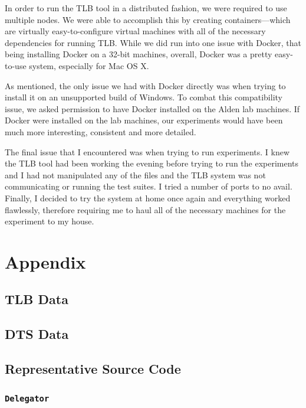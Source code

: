 \documentclass{article}
\begin{document}
{In order to run the TLB tool in a distributed fashion, we were required to use multiple nodes.
We were able to accomplish this by creating containers---which are virtually easy-to-configure
virtual machines with all of the necessary dependencies for running TLB. While we did run
into one issue with Docker, that being installing Docker on a 32-bit machines, overall,
Docker was a pretty easy-to-use system, especially for Mac OS X.

As mentioned, the only issue we had with Docker directly was when trying to install it on an unsupported
build of Windows. To combat this compatibility issue, we asked permission to have Docker
installed on the Alden lab machines. If Docker were installed on the lab machines,
our experiments would have been much more interesting, consistent and more detailed.

The final issue that I encountered was when trying to run experiments. I knew the TLB tool had
been working the evening before trying to run the experiments and I had not manipulated any of
the files and the TLB system was not communicating or running the test suites. I tried a number of
ports to no avail. Finally, I decided to try the system at home once again and everything worked
flawlessly, therefore requiring me to haul all of the necessary machines for the experiment
to my house.


\section{Appendix}
\label{appendix}
\subsection{TLB Data}

\newpage
\subsection{DTS Data}


\newpage
\subsection{Representative Source Code}
\subsubsection{\texttt{Delegator}}


}
\end{document}

